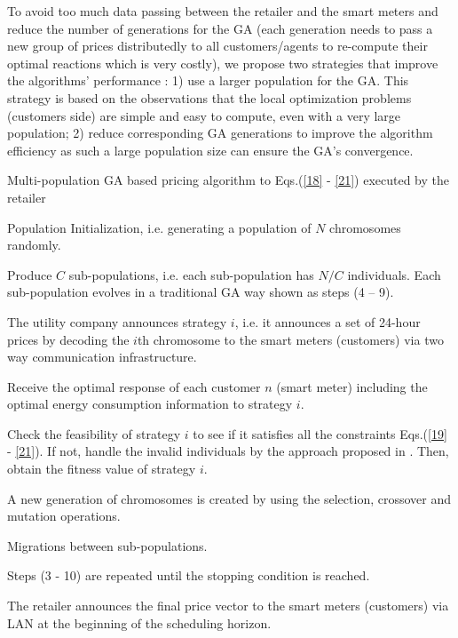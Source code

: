 \documentclass[10pt,journal]{IEEEtran}
\theoremstyle{definition}
\theoremstyle{plain} \newtheorem{theo}{Theorem} \newtheorem{prop}{Proposition}  \newtheorem{lemm}{Lemma}
\begin{document}
To avoid too much data passing between the retailer and the smart meters and reduce the number of generations for the GA (each generation needs to pass a new group of prices distributedly to all customers/agents to re-compute their optimal reactions which is very costly), we propose two strategies that improve the algorithms' performance : 1) use a larger population for the GA. This strategy is based on the observations that the local optimization problems (customers side) are simple and easy to compute, even with a very large population; 2) reduce corresponding GA generations to improve the algorithm efficiency as such a large population size can ensure the GA's convergence. 

\begin{algorithm}[!t]

\renewcommand{\algorithmicrequire}{\textbf{}}



\caption{Multi-population GA based pricing algorithm to Eqs.(\ref{18} - \ref{21}) executed by the retailer}
\label{Algorithm:GA based decision-making scheme algorithm}

\begin{algorithmic}[1]

\STATE Population Initialization, i.e. generating a population of $N$ chromosomes randomly. 

\STATE Produce $C$ sub-populations, i.e. each sub-population has $N/C$ individuals.
\STATE Each sub-population evolves in a traditional GA way shown as steps (4 -- 9).

\STATE The utility company announces strategy $i$, i.e. it announces a set of 24-hour prices by decoding the $i$th chromosome to the smart meters (customers) via two way communication infrastructure.

\STATE Receive the optimal response of each customer $n$ (smart meter) including the optimal energy consumption information to strategy $i$.

\STATE Check the feasibility of strategy $i$ to see if it satisfies all the constraints Eqs.(\ref{19} - \ref{21}). If not, handle the invalid individuals by the approach proposed in \cite{deb2000efficient}. Then, obtain the fitness value of  strategy $i$. 
\ENDFOR

\STATE A new generation of chromosomes is created by using the selection, crossover and mutation operations.

\STATE Migrations between sub-populations.

\STATE Steps (3 - 10) are repeated until the stopping condition is
reached.

\STATE The retailer announces the final price vector to the smart meters (customers) via LAN at the beginning of the scheduling horizon.
\end{algorithmic}
\end{algorithm}
\end{document}
